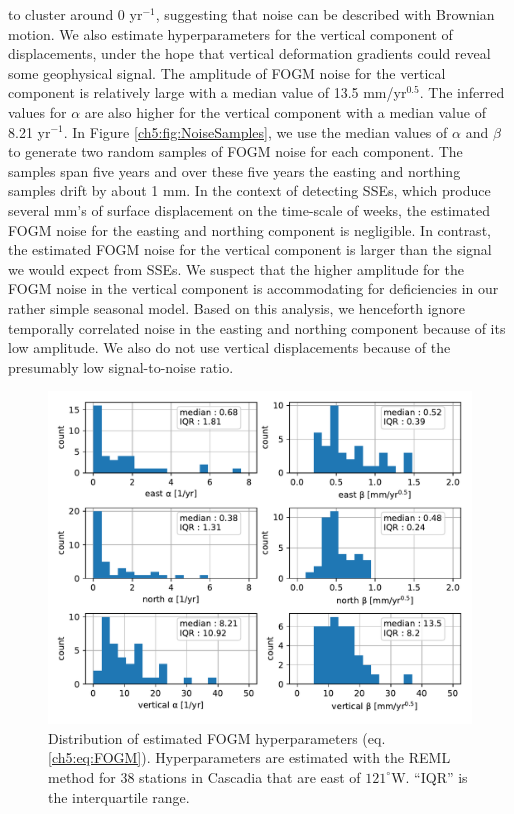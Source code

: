 to cluster around 0 yr$^{-1}$, suggesting that noise can be described
with Brownian motion. We also estimate hyperparameters for the
vertical component of displacements, under the hope that vertical
deformation gradients could reveal some geophysical signal. The
amplitude of FOGM noise for the vertical component is relatively large
with a median value of 13.5 mm/yr$^{0.5}$.  The inferred values for
$\alpha$ are also higher for the vertical component with a median
value of 8.21 yr$^{-1}$. In Figure \ref{ch5:fig:NoiseSamples}, we use
the median values of $\alpha$ and $\beta$ to generate two random
samples of FOGM noise for each component. The samples span five years
and over these five years the easting and northing samples drift by
about 1 mm. In the context of detecting SSEs, which produce several
mm's of surface displacement on the time-scale of weeks, the estimated
FOGM noise for the easting and northing component is negligible. In
contrast, the estimated FOGM noise for the vertical component is
larger than the signal we would expect from SSEs. We suspect that the
higher amplitude for the FOGM noise in the vertical component is
accommodating for deficiencies in our rather simple seasonal model.
Based on this analysis, we henceforth ignore temporally correlated
noise in the easting and northing component because of its low
amplitude. We also do not use vertical displacements because of the
presumably low signal-to-noise ratio.

\begin{figure}
\includegraphics{ch5/figures/noise/noise-params.pdf}
\caption{Distribution of estimated FOGM hyperparameters (eq.
\ref{ch5:eq:FOGM}). Hyperparameters are estimated with the REML method
for 38 stations in Cascadia that are east of $121^\circ$W. ``IQR'' is
the interquartile range.}
\label{ch5:fig:NoiseParams}
\end{figure}

